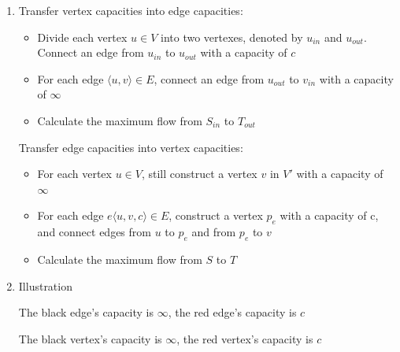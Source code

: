 \begin{enumerate}[(1)]
\item
	Transfer vertex capacities into edge capacities:
	\begin{itemize}
		\item Divide each vertex $u \in V$ into two vertexes, denoted by $u_{in}$ and $u_{out}$. Connect an edge from $u_{in}$ to $u_{out}$ with a capacity of $c$
		\item For each edge $\langle u, v \rangle \in E$, connect an edge from $u_{out}$ to $v_{in}$ with a capacity of $\infty$
		\item Calculate the maximum flow from $S_{in}$ to $T_{out}$
	\end{itemize}

	Transfer edge capacities into vertex capacities:
	\begin{itemize}
		\item For each vertex $u \in V$, still construct a vertex $v$ in $V'$ with a capacity of $\infty$
		\item For each edge $e\langle u, v, c\rangle \in E$, construct a vertex $p_e$ with a capacity of c, and connect edges from $u$ to $p_e$ and from $p_e$ to $v$
		\item Calculate the maximum flow from $S$ to $T$
	\end{itemize}
	\item Illustration

	The black edge's capacity is $\infty$, the red edge's capacity is $c$

	The black vertex's capacity is $\infty$, the red vertex's capacity is $c$


\end{enumerate}
